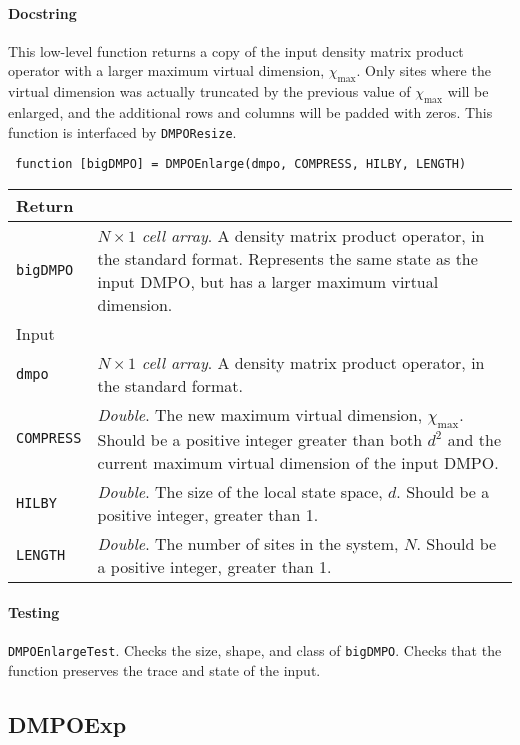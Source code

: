  \paragraph{Docstring} This low-level function returns a copy of the input density matrix product operator with a larger maximum virtual dimension, \(\chi_{\mathrm{max}}\). Only sites where the virtual dimension was actually truncated by the previous value of \(\chi_{\mathrm{max}}\) will be enlarged, and the additional rows and columns will be padded with zeros. This function is interfaced by \lstinline$DMPOResize$.
 \begin{lstlisting} 
 function [bigDMPO] = DMPOEnlarge(dmpo, COMPRESS, HILBY, LENGTH) \end{lstlisting}
 \begin{longtabu}{X[1,1]X[4,1]}
 \hline
 Return & \\ \hline
 \lstinline$bigDMPO$ & \emph{\(N \times 1\) cell array}. A density matrix product operator, in the standard format. Represents the same state as the input DMPO, but has a larger maximum virtual dimension. \\ \hline
 Input & \\ \hline
 \lstinline$dmpo$ & \emph{\(N \times 1\) cell array}. A density matrix product operator, in the standard format. \\
 \lstinline$COMPRESS$ & \emph{Double}. The new maximum virtual dimension, \(\chi_{\mathrm{max}}\). Should be a positive integer greater than both \(d^{2}\) and the current maximum virtual dimension of the input DMPO. \\
 \lstinline$HILBY$ & \emph{Double}. The size of the local state space, \(d\). Should be a positive integer, greater than 1. \\
 \lstinline$LENGTH$ & \emph{Double}. The number of sites in the system, \(N\). Should be a positive integer, greater than 1. \\
 \hline
 \end{longtabu}
 \paragraph{Testing} \lstinline$DMPOEnlargeTest$. Checks the size, shape, and class of \lstinline$bigDMPO$. Checks that the function preserves the trace and state of the input. 
 
 \subsection{DMPOExp}
